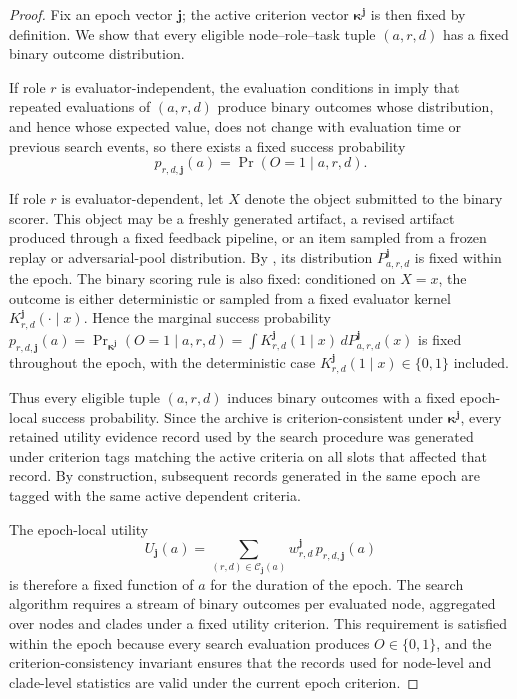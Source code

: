 \begin{proof}
Fix an epoch vector \(\boldsymbol{j}\); the active criterion vector
\(\boldsymbol{\kappa}^{\boldsymbol{j}}\) is then fixed by definition. We show that every eligible
node--role--task tuple \((a,r,d)\) has a fixed binary outcome distribution.

If role \(r\) is evaluator-independent, the \hgm evaluation conditions in
 imply that repeated evaluations of \((a,r,d)\) produce binary outcomes whose
distribution, and hence whose expected value, does not change with evaluation time or previous
search events, so there exists a fixed success probability
\[
p_{r,d,\boldsymbol{j}}(a)=\Pr(O=1\mid a,r,d).
\]

If role \(r\) is evaluator-dependent, let \(X\) denote the object submitted to the binary scorer. This
object may be a freshly generated artifact, a revised artifact produced through a fixed feedback
pipeline, or an item sampled from a frozen replay or adversarial-pool distribution. By
, its distribution \(P_{a,r,d}^{\boldsymbol{j}}\) is fixed within the epoch. The
binary scoring rule is also fixed: conditioned on \(X=x\), the outcome is either deterministic or
sampled from a fixed evaluator kernel \(K_{r,d}^{\boldsymbol{j}}(\cdot\mid x)\). Hence the marginal
success probability \(p_{r,d,\boldsymbol{j}}(a)=\Pr_{\boldsymbol{\kappa}^{\boldsymbol{j}}}(O=1\mid a,r,d)=\int K_{r,d}^{\boldsymbol{j}}(1\mid x)\,dP_{a,r,d}^{\boldsymbol{j}}(x)\) is fixed throughout the epoch, with the deterministic case \(K_{r,d}^{\boldsymbol{j}}(1\mid x)\in\{0,1\}\) included.

Thus every eligible tuple \((a,r,d)\) induces binary outcomes with a fixed epoch-local success
probability. Since the archive is criterion-consistent under
\(\boldsymbol{\kappa}^{\boldsymbol{j}}\), every retained utility evidence record used by the search
procedure was generated under criterion tags matching the active criteria on all slots that affected
that record. By construction, subsequent records generated in the same epoch are tagged
with the same active dependent criteria.

The epoch-local utility
\[
U_{\boldsymbol{j}}(a)
=
\sum_{(r,d)\in\mathcal C_{\boldsymbol{j}}(a)}
w_{r,d}^{\boldsymbol{j}}\,p_{r,d,\boldsymbol{j}}(a)
\]
is therefore a fixed function of \(a\) for the duration of the epoch. The \hgm search
algorithm requires a stream of binary outcomes per evaluated node, aggregated over nodes and
clades under a fixed utility criterion. This requirement is satisfied within the epoch because every
search evaluation produces \(O\in\{0,1\}\), and the criterion-consistency invariant ensures that the
records used for node-level and clade-level statistics are valid under the current epoch criterion.


\end{proof}
